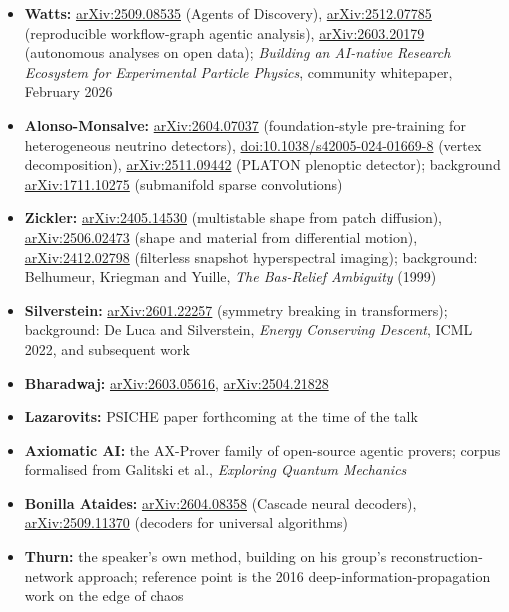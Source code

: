 \documentclass[11pt]{article}
\begin{document}
\begin{itemize}[leftmargin=*]
    \item \textbf{Watts:} \href{https://arxiv.org/abs/2509.08535}{arXiv:2509.08535} (Agents of Discovery), \href{https://arxiv.org/abs/2512.07785}{arXiv:2512.07785} (reproducible workflow-graph agentic analysis), \href{https://arxiv.org/abs/2603.20179}{arXiv:2603.20179} (autonomous analyses on open data); \emph{Building an AI-native Research Ecosystem for Experimental Particle Physics}, community whitepaper, February 2026
    \item \textbf{Alonso-Monsalve:} \href{https://arxiv.org/abs/2604.07037}{arXiv:2604.07037} (foundation-style pre-training for heterogeneous neutrino detectors), \href{https://doi.org/10.1038/s42005-024-01669-8}{doi:10.1038/s42005-024-01669-8} (vertex decomposition), \href{https://arxiv.org/abs/2511.09442}{arXiv:2511.09442} (PLATON plenoptic detector); background \href{https://arxiv.org/abs/1711.10275}{arXiv:1711.10275} (submanifold sparse convolutions)
    \item \textbf{Zickler:} \href{https://arxiv.org/abs/2405.14530}{arXiv:2405.14530} (multistable shape from patch diffusion), \href{https://arxiv.org/abs/2506.02473}{arXiv:2506.02473} (shape and material from differential motion), \href{https://arxiv.org/abs/2412.02798}{arXiv:2412.02798} (filterless snapshot hyperspectral imaging); background: Belhumeur, Kriegman and Yuille, \emph{The Bas-Relief Ambiguity} (1999)
    \item \textbf{Silverstein:} \href{https://arxiv.org/abs/2601.22257}{arXiv:2601.22257} (symmetry breaking in transformers); background: De Luca and Silverstein, \emph{Energy Conserving Descent}, ICML 2022, and subsequent work
    \item \textbf{Bharadwaj:} \href{https://arxiv.org/abs/2603.05616}{arXiv:2603.05616}, \href{https://arxiv.org/abs/2504.21828}{arXiv:2504.21828}
    \item \textbf{Lazarovits:} PSICHE paper forthcoming at the time of the talk
    \item \textbf{Axiomatic AI:} the AX-Prover family of open-source agentic provers; corpus formalised from Galitski et al., \emph{Exploring Quantum Mechanics}
    \item \textbf{Bonilla Ataides:} \href{https://arxiv.org/abs/2604.08358}{arXiv:2604.08358} (Cascade neural decoders), \href{https://arxiv.org/abs/2509.11370}{arXiv:2509.11370} (decoders for universal algorithms)
    \item \textbf{Thurn:} the speaker's own method, building on his group's reconstruction-network approach; reference point is the 2016 deep-information-propagation work on the edge of chaos

\end{itemize}
\end{document}
